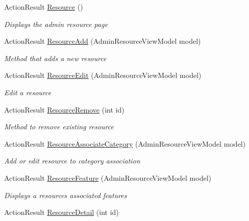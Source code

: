 \begin{DoxyCompactItemize}
Action\+Result \mbox{\hyperlink{class_ox_tots_1_1_controllers_1_1_admin_controller_ac9882a823484bb9c8b4aa5d69d9acb3c}{Resource}} ()
\begin{DoxyCompactList}\small\item\em Displays the admin resource page \end{DoxyCompactList}\item 
Action\+Result \mbox{\hyperlink{class_ox_tots_1_1_controllers_1_1_admin_controller_a8077cc90ebef79e6d89a7ea0c4d4685a}{Resource\+Add}} (Admin\+Resource\+View\+Model model)
\begin{DoxyCompactList}\small\item\em Method that adds a new resource \end{DoxyCompactList}\item 
Action\+Result \mbox{\hyperlink{class_ox_tots_1_1_controllers_1_1_admin_controller_a987f062c86e60140596a7941670d3995}{Resource\+Edit}} (Admin\+Resource\+View\+Model model)
\begin{DoxyCompactList}\small\item\em Edit a resource \end{DoxyCompactList}\item 
Action\+Result \mbox{\hyperlink{class_ox_tots_1_1_controllers_1_1_admin_controller_a4af2a0f2d61212e1170629cff6b6600c}{Resource\+Remove}} (int id)
\begin{DoxyCompactList}\small\item\em Method to remove existing resource \end{DoxyCompactList}\item 
Action\+Result \mbox{\hyperlink{class_ox_tots_1_1_controllers_1_1_admin_controller_a0ff5ac2ffad66d36d8116d95354e3276}{Resource\+Associate\+Category}} (Admin\+Resource\+View\+Model model)
\begin{DoxyCompactList}\small\item\em Add or edit resource to category association \end{DoxyCompactList}\item 
Action\+Result \mbox{\hyperlink{class_ox_tots_1_1_controllers_1_1_admin_controller_a4cdef49790ac2650df4ba4d4a8421852}{Resource\+Feature}} (Admin\+Resource\+View\+Model model)
\begin{DoxyCompactList}\small\item\em Displays a resource\textquotesingle{}s associated features \end{DoxyCompactList}\item 
Action\+Result \mbox{\hyperlink{class_ox_tots_1_1_controllers_1_1_admin_controller_a279bcb46454167cff4955aaf42927033}{Resource\+Detail}} (int id)

\end{DoxyCompactItemize}
